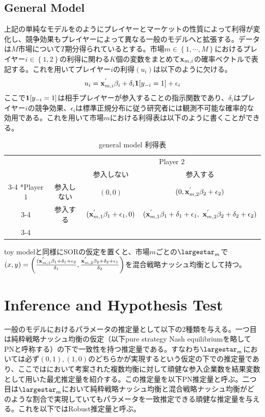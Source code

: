 \documentclass{jsarticle}
\begin{document}
\subsection{General Model}
上記の単純なモデルを\cite{Tamer2003a}のようにプレイヤーとマーケットの性質によって利得が変化し、競争効果もプレイヤーによって異なる一般のモデルへと拡張する。データは$M$市場について$T$期分得られているとする。市場$m \in \left\{ 1, \cdots, M\right\}$におけるプレイヤー$i \in \left\{ 1,2\right\}$の利得に関わる$K$個の変数をまとめて${\bf x}_{m, i}$の確率ベクトルで表記する。これを用いてプレイヤー$i$の利得$(u_i)$は以下のように欠ける。
\begin{align*}
	u_i = {\bf x}_{m, i}^{'} \beta_i + \delta_i {\bf 1}[y_{-i} = 1]+ \epsilon_i
\end{align*}
ここで${\bf 1}[y_{-i} = 1]$は相手プレイヤーが参入することの指示関数であり、$\delta_i$はプレイヤー$i$の競争効果、$\epsilon_i$は標準正規分布に従う研究者には観測不可能な確率的な効用である。これを用いて市場$m$における利得表は以下のように書くことができる。
\begin{table}[h]
    \caption{general model 利得表}
    \centering
    \setlength{\extrarowheight}{2pt}
    \begin{tabular}{cc|c|c|}
      & \multicolumn{1}{c}{} & \multicolumn{2}{c}{Player $2$}\\
      & \multicolumn{1}{c}{} & \multicolumn{1}{c}{参入しない}  & \multicolumn{1}{c}{参入する} \\\cline{3-4}
      \multirow{2}*{Player $1$}  & 参入しない & $(0,0)$ & $(0,{\bf x}_{m, 2}^{'} \beta_2+\epsilon_2)$ \\\cline{3-4}
      & 参入する & $({\bf x}_{m, 1}^{'} \beta_1+\epsilon_1,0)$ & $({\bf x}_{m, 1}^{'} \beta_1+\delta_1+\epsilon_1,\ {\bf x}_{m, 2}^{'} \beta_2+\delta_2+\epsilon_2)$ \\\cline{3-4}
    \end{tabular}
\end{table}

toy modelと同様にSORの仮定を置くと、市場$m$ごとの$\largestar_m$で$(x, y) = \left( \frac{({\bf x}_{m, 1}^{'} \beta_1 + \delta_1 + \epsilon_2}{\delta_1} ,  \frac{{\bf x}_{m, 2}^{'} \beta_2 + \delta_2 + \epsilon_1}{\delta_2} \right)$を混合戦略ナッシュ均衡として持つ。


\section{Inference and Hypothesis Test}
一般のモデルにおけるパラメータの推定量として以下の2種類を与える。一つ目は純粋戦略ナッシュ均衡の仮定（以下pure strategy Nash equilibriumを略してPNと呼称する）の下で一致性を持つ推定量である。すなわち$\largestar_m$においては必ず$(0,1), (1,0)$のどちらかが実現するという仮定の下での推定量であり、ここでは\cite{Bresnahan1991}において考案された複数均衡に対して頑健な参入企業数を結果変数として用いた最尤推定量を紹介する。この推定量を以下PN推定量と呼ぶ。二つ目は$\largestar_m$において純粋戦略ナッシュ均衡と混合戦略ナッシュ均衡がどのような割合で実現していてもパラメータを一致推定できる頑健な推定量を与える。これを以下ではRobust推定量と呼ぶ。
\end{document}
